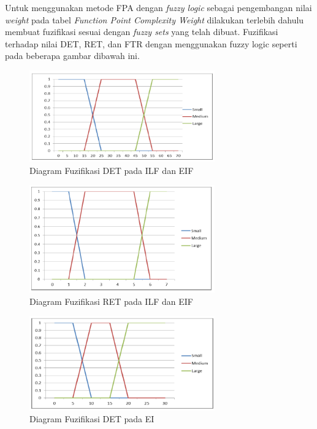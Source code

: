 \documentclass[a4paper]{article}
\begin{document}
\begin{multicols}{2}
\par Untuk menggunakan metode FPA dengan \textit{fuzzy logic} sebagai pengembangan nilai \textit{weight} pada tabel \textit{Function Point Complexity Weight} dilakukan terlebih dahulu membuat fuzifikasi sesuai dengan \textit{fuzzy sets} yang telah dibuat. Fuzifikasi terhadap nilai DET, RET, dan FTR dengan menggunakan fuzzy logic seperti pada beberapa gambar dibawah ini.

\begin{figure}[H]
    \centering
    \includegraphics[width=8cm]{gambar2diagramfuzifikasidet.png}
    \caption{Diagram Fuzifikasi DET pada ILF dan EIF}
    \label{gb2}
\end{figure}

\begin{figure}[H]
    \centering
    \includegraphics[width=8cm]{gambar3diagramfuzifikasiret.png}
    \caption{Diagram Fuzifikasi RET pada ILF dan EIF}
    \label{gb3}
\end{figure}

\begin{figure}[H]
    \centering
    \includegraphics[width=8cm]{gambar4diagramfuzifikasidet.png}
    \caption{Diagram Fuzifikasi DET pada EI}
    \label{gb4}
\end{figure}


\end{multicols}
\end{document}
